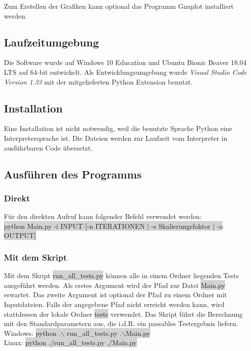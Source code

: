 \documentclass[a4paper,11pt]{article}
\begin{document}
{Zum Erstellen der Grafiken kann optional das Programm Gnuplot installiert werden.

\subsection{Laufzeitumgebung}
Die Software wurde auf Windows 10 Education und Ubuntu Bionic Beaver 18.04 LTS auf 64-bit entwickelt. Als Entwicklungsumgebung wurde \textit{Visual Studio Code Version 1.33}
mit der mitgelieferten Python Extension benutzt. 

\subsection{Installation}

Eine Installation ist nicht notwendig, weil die benutzte Sprache Python eine Interpretersprache ist. Die Dateien werden zur Laufzeit vom Interpreter in ausf\"uhrbaren Code \"ubersetzt.


\subsection{Ausführen des Programms}
\subsubsection{Direkt}
F\"ur den direkten Aufruf kann folgender Befehl verwendet werden:\\
\colorbox{lightgray}{python Main.py -i INPUT [-n ITERATIONEN $|$ -s Skalierungsfaktor $|$ -o OUTPUT]}

\subsubsection{Mit dem Skript}
Mit dem Skript \colorbox{lightgray}{run\_all\_tests.py} k\"onnen alle in einem Ordner liegenden Tests ausgef\"uhrt werden. Als erstes Argument wird der Pfad zur Datei \colorbox{lightgray}{Main.py} erwartet. Das zweite Argument
ist optional der Pfad zu einem Ordner mit Inputdateien. Falls der angegebene Pfad nicht erreicht werden kann, wird stattdessen der lokale Ordner \colorbox{lightgray}{tests}
verwendet. Das Skript f\"uhrt die Berechnung mit den Standardparametern aus, die i.d.R. ein passables Testergebnis liefern.\\
Windows: \colorbox{lightgray}{python .$\backslash$ run\_all\_tests.py .$\backslash$Main.py}\\
Linux: \colorbox{lightgray}{python ./run\_all\_tests.py ./Main.py}\\
}
\end{document}
